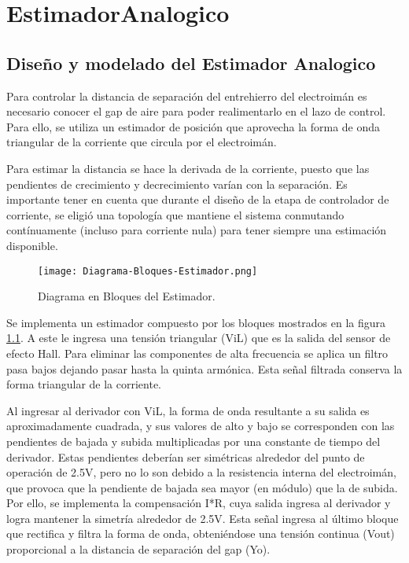 \chapter{EstimadorAnalogico}  \label{cap:Estimador Analogico}

\section{Diseño y modelado del Estimador Analogico}

Para controlar la distancia de separaci\'{o}n del entrehierro del electroim\'{a}n es necesario conocer el gap de aire para poder realimentarlo en el lazo de control.  Para ello, se utiliza un estimador de posici\'{o}n que aprovecha la forma de onda triangular de la corriente que circula por el electroim\'{a}n. 



\noindent Para estimar la distancia se hace la derivada de la corriente, puesto que las pendientes de crecimiento y decrecimiento var\'{i}an con la separaci\'{o}n. Es importante tener en cuenta que durante el dise\~{n}o de la etapa de controlador de corriente, se eligi\'{o} una topolog\'{i}a que mantiene el sistema conmutando cont\'{i}nuamente (incluso para corriente nula) para tener siempre una estimaci\'{o}n disponible.

\begin{figure}[H]
	\centering
	\texttt{[image: Diagrama-Bloques-Estimador.png]}
	\caption{Diagrama en Bloques del Estimador.}
	\label{fig:img_Diagrama-Bloques-Estimador.png}
\end{figure}

\noindent Se implementa un estimador compuesto por los bloques mostrados en la figura \ref{fig:img_Diagrama-Bloques-Estimador.png}. A este le ingresa una tensi\'{o}n triangular (ViL) que es la salida del sensor de efecto Hall. Para eliminar las componentes de alta frecuencia se aplica un filtro pasa bajos dejando pasar hasta la quinta arm\'{o}nica. Esta se\~{n}al filtrada conserva la forma triangular de la corriente. 



\noindent Al ingresar al derivador con ViL, la forma de onda resultante a su salida es aproximadamente cuadrada, y sus valores de alto y bajo se corresponden con las pendientes de bajada y subida multiplicadas por una constante de tiempo del derivador. Estas pendientes deber\'{i}an ser sim\'{e}tricas alrededor del punto de operaci\'{o}n de 2.5V, pero no lo son debido a la resistencia interna del electroim\'{a}n, que provoca que la pendiente de bajada sea mayor (en m\'{o}dulo) que la de subida. Por ello, se implementa la compensaci\'{o}n I*R, cuya salida ingresa al derivador y logra mantener la simetr\'{i}a alrededor de 2.5V. Esta se\~{n}al ingresa al \'{u}ltimo bloque que rectifica y filtra la forma de onda, obteni\'{e}ndose una tensi\'{o}n continua (Vout) proporcional a la distancia de separaci\'{o}n del gap (Yo).



